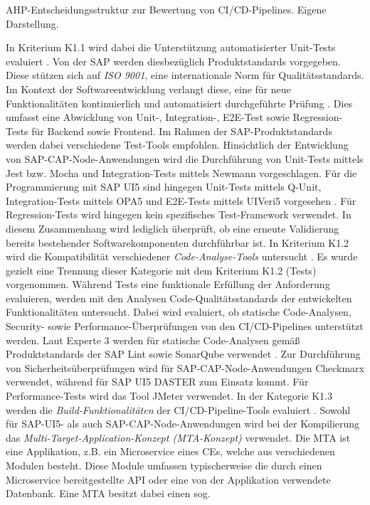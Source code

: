  \begin{center}
	\begin{table}[H]
		\centering
		\caption[AHP-Entscheidungsstruktur zur Bewertung von CI/CD-Pipelines]{AHP-Entscheidungsstruktur zur Bewertung von CI/CD-Pipelines. Eigene Darstellung.}
		\label{fig:AHP_E}
	\end{table}
\end{center}
\vspace*{-15mm}
In Kriterium K1.1 wird dabei die Unterstützung automatisierter Unit-Tests evaluiert \cite[Z. 72 ff.]{ProductOwnerSAPBTPProd&Infra.}. Von der SAP werden diesbezüglich Produktstandards vorgegeben. Diese stützen sich auf \textit{ISO 9001}, eine internationale Norm für Qualitätsstandards. Im Kontext der Softwareentwicklung verlangt diese, eine für neue Funktionalitäten kontinuierlich und automatisiert durchgeführte Prüfung \cite[Z. 65 ff.]{TestDeveloperSAPHyperspaceAdoption&Onboarding.b}. Dies umfasst eine Abwicklung von Unit-, Integration-, E2E-Test sowie Regression-Tests für Backend sowie Frontend. Im Rahmen der SAP-Produktstandards werden dabei verschiedene Test-Tools empfohlen. Hinsichtlich der Entwicklung von SAP-CAP-Node-Anwendungen wird die Durchführung von Unit-Tests mittels Jest bzw. Mocha und Integration-Tests mittels Newmann vorgeschlagen. Für die Programmierung mit SAP UI5 sind hingegen Unit-Tests mittels Q-Unit, Integration-Tests mittels OPA5 und E2E-Tests mittels UIVeri5 vorgesehen \cite[Z. 66 ff.]{TestDeveloperSAPHyperspaceAdoption&Onboarding.b}. Für Regression-Tests wird hingegen kein spezifisches Test-Framework verwendet. In diesem Zusammenhang wird lediglich überprüft, ob eine erneute Validierung bereits bestehender Softwarekomponenten durchführbar ist. In Kriterium K1.2 wird die Kompatibilität verschiedener \textit{Code-Analyse-Tools} untersucht \cite[Z. 72 ff.]{ProductOwnerSAPBTPProd&Infra.}. Es wurde gezielt eine Trennung dieser Kategorie mit dem Kriterium K1.2 (Tests) vorgenommen. Während Tests eine funktionale Erfüllung der Anforderung evaluieren, werden  mit den Analysen Code-Qualitätsstandards der entwickelten Funktionalitäten untersucht. Dabei wird evaluiert, ob statische Code-Analysen, Security- sowie Performance-Überprüfungen von den CI/CD-Pipelines unterstützt werden. Laut Experte 3 werden für statische Code-Analysen gemäß Produktstandards der SAP Lint sowie SonarQube verwendet \cite[Z. 44 ff.]{ProductManagerSAPHyperspaceSecurityTools.}. Zur Durchführung von Sicherheitsüberprüfungen wird für SAP-CAP-Node-Anwendungen Checkmarx verwendet, während für SAP UI5 DASTER zum Einsatz kommt. Für Performance-Tests wird das Tool JMeter verwendet. In der Kategorie K1.3 werden die \textit{Build-Funktionalitäten} der CI/CD-Pipeline-Tools evaluiert \cite[Z. 71 ff.]{ProductOwnerSAPBTPProd&Infra.}. Sowohl für SAP-UI5- als auch SAP-CAP-Node-Anwendungen wird bei der Kompilierung das \textit{Multi-Target-Application-Konzept (\acs{MTA}-Konzept)} verwendet. Die MTA ist eine Applikation, z.B. ein Microservice eines CEs, welche aus verschiedenen Modulen besteht. Diese Module umfassen typischerweise die durch einen Microservice bereitgestellte API oder eine von der Applikation verwendete Datenbank. Eine MTA besitzt dabei einen sog. 